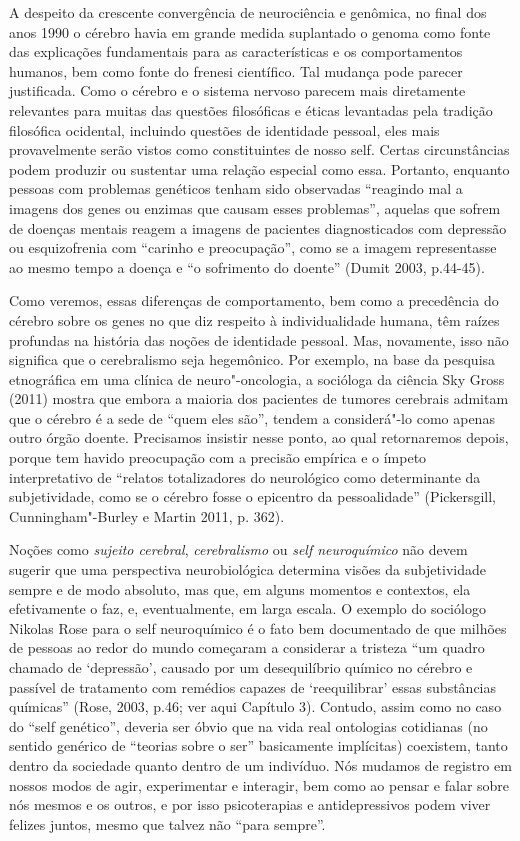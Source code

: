 A despeito da crescente convergência de neurociência e genômica, no
final dos anos 1990 o cérebro havia em grande medida suplantado o genoma
como fonte das explicações fundamentais para as características e os
comportamentos humanos, bem como fonte do frenesi científico. Tal
mudança pode parecer justificada. Como o cérebro e o sistema nervoso
parecem mais diretamente relevantes para muitas das questões filosóficas
e éticas levantadas pela tradição filosófica ocidental, incluindo
questões de identidade pessoal, eles mais provavelmente serão vistos
como constituintes de nosso self. Certas circunstâncias podem produzir
ou sustentar uma relação especial como essa. Portanto, enquanto pessoas
com problemas genéticos tenham sido observadas ``reagindo mal a imagens
dos genes ou enzimas que causam esses problemas'', aquelas que sofrem de
doenças mentais reagem a imagens de pacientes diagnosticados com
depressão ou esquizofrenia com ``carinho e preocupação'', como se a
imagem representasse ao mesmo tempo a doença e ``o sofrimento do
doente'' (Dumit 2003, p.44-45).

Como veremos, essas diferenças de comportamento, bem como a precedência
do cérebro sobre os genes no que diz respeito à individualidade humana,
têm raízes profundas na história das noções de identidade pessoal. Mas,
novamente, isso não significa que o cerebralismo seja hegemônico. Por
exemplo, na base da pesquisa etnográfica em uma clínica de
neuro"-oncologia, a socióloga da ciência Sky Gross (2011) mostra que
embora a maioria dos pacientes de tumores cerebrais admitam que o
cérebro é a sede de ``quem eles são'', tendem a considerá"-lo como apenas
outro órgão doente. Precisamos insistir nesse ponto, ao qual
retornaremos depois, porque tem havido preocupação com a precisão
empírica e o ímpeto interpretativo de ``relatos totalizadores do
neurológico como determinante da subjetividade, como se o cérebro fosse
o epicentro da pessoalidade'' (Pickersgill, Cunningham"-Burley e Martin
2011, p. 362).

Noções como \emph{sujeito cerebral}, \emph{cerebralismo} ou \emph{self
neuroquímico} não devem sugerir que uma perspectiva neurobiológica
determina visões da subjetividade sempre e de modo absoluto, mas que, em
alguns momentos e contextos, ela efetivamente o faz, e, eventualmente,
em larga escala. O exemplo do sociólogo Nikolas Rose para o self
neuroquímico é o fato bem documentado de que milhões de pessoas ao redor
do mundo começaram a considerar a tristeza ``um quadro chamado de
`depressão', causado por um desequilíbrio químico no cérebro e passível
de tratamento com remédios capazes de `reequilibrar' essas substâncias
químicas'' (Rose, 2003, p.46; ver aqui Capítulo 3). Contudo, assim como
no caso do ``self genético'', deveria ser óbvio que na vida real
ontologias cotidianas (no sentido genérico de ``teorias sobre o ser''
basicamente implícitas) coexistem, tanto dentro da sociedade quanto
dentro de um indivíduo. Nós mudamos de registro em nossos modos de agir,
experimentar e interagir, bem como ao pensar e falar sobre nós mesmos e
os outros, e por isso psicoterapias e antidepressivos podem viver
felizes juntos, mesmo que talvez não ``para sempre''.

